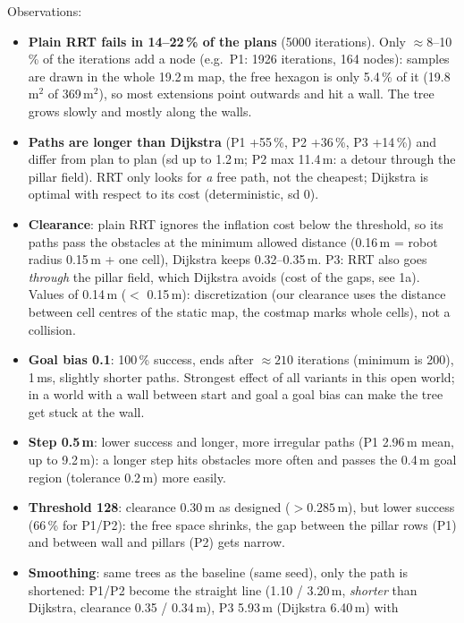 \documentclass[10pt]{article}
\begin{document}
Observations:
\begin{itemize}
  \item \textbf{Plain RRT fails in 14--22\,\% of the plans} (5000 iterations). Only $\approx 8$--10\,\% of the iterations
        add a node (e.g.\ P1: 1926 iterations, 164 nodes): samples are drawn in the whole 19.2\,m map, the free hexagon
        is only 5.4\,\% of it (19.8\,m$^2$ of 369\,m$^2$), so most extensions point outwards and hit a wall. The tree grows slowly and
        mostly along the walls.
  \item \textbf{Paths are longer than Dijkstra} (P1 +55\,\%, P2 +36\,\%, P3 +14\,\%) and differ from plan to plan (sd up
        to 1.2\,m; P2 max 11.4\,m: a detour through the pillar field). RRT only looks for \emph{a} free path, not the
        cheapest; Dijkstra is optimal with respect to its cost (deterministic, sd 0).
  \item \textbf{Clearance}: plain RRT ignores the inflation cost below the threshold, so its paths pass the obstacles at
        the minimum allowed distance (0.16\,m = robot radius 0.15\,m + one cell), Dijkstra keeps 0.32--0.35\,m.
        P3: RRT also goes \emph{through} the pillar field, which Dijkstra avoids (cost of the gaps, see 1a).
        Values of 0.14\,m ($<$ 0.15\,m): discretization (our clearance uses the distance between cell centres of the
        static map, the costmap marks whole cells), not a collision.
  \item \textbf{Goal bias 0.1}: 100\,\% success, ends after $\approx 210$ iterations (minimum is 200), 1\,ms, slightly
        shorter paths. Strongest effect of all variants in this open world; in a world with a wall between start and goal
        a goal bias can make the tree get stuck at the wall.
  \item \textbf{Step 0.5\,m}: lower success and longer, more irregular paths (P1 2.96\,m mean, up to 9.2\,m): a longer step
        hits obstacles more often and passes the 0.4\,m goal region (tolerance 0.2\,m) more easily.
  \item \textbf{Threshold 128}: clearance 0.30\,m as designed ($> 0.285$\,m), but lower success (66\,\% for P1/P2): the free
        space shrinks, the gap between the pillar rows (P1) and between wall and pillars (P2) gets narrow.
  \item \textbf{Smoothing}: same trees as the baseline (same seed), only the path is shortened: P1/P2 become the straight
        line (1.10 / 3.20\,m, \emph{shorter} than Dijkstra, clearance 0.35 / 0.34\,m), P3 5.93\,m (Dijkstra 6.40\,m) with

\end{itemize}
\end{document}
